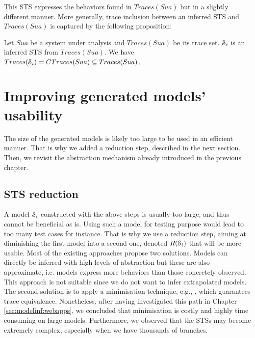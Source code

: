 This STS expresses the behaviors found in $Traces(Sua)$ but in a
slightly different manner. More generally, trace inclusion
between an inferred STS and $Traces(Sua)$ is captured by the
following proposition:

\begin{proposition}
  Let $Sua$ be a system under analysis and $Traces(Sua)$ be its
  trace set. $\EuScript{S}_i$ is an inferred STS from
  $Traces(Sua)$.
  We have $Traces(\EuScript{S}_i) = CTraces(Sua) \subseteq Traces(Sua)$.

	\label{def:equivtraces_IOSTS}
\end{proposition}


\section{Improving generated models' usability}
\label{sec:modelinf:usability}

The size of the generated models is likely too large to be used
in an efficient manner. That is why we added a reduction step,
described in the next section. Then, we revisit the abstraction
mechanism already introduced in the previous chapter.

\subsection{STS reduction}
\label{sec:modelinf:prodsystems:reduction}

A model $\EuScript{S}_i$ constructed with the above steps is
usually too large, and thus cannot be beneficial as is. Using
such a model for testing purpose would lead to too many test
cases for instance. That is why we use a reduction step, aiming
at diminishing the first model into a second one, denoted
$R(\EuScript{S}_i)$ that will be more usable. Most of the
existing approaches propose two solutions. Models can directly be
inferred with high levels of abstraction but these are also
approximate, i.e. models express more behaviors than those
concretely observed. This approach is not suitable since we do
not want to infer extrapolated models. The second solution is to
apply a minimisation technique, e.g., \cite{Abdulla06}, which
guarantees trace equivalence. Nonetheless, after having
investigated this path in Chapter \ref{sec:modelinf:webapps}, we
concluded that minimisation is costly and highly time consuming
on large models. Furthermore, we observed that the STSs may
become extremely complex, especially when we have thousands of
branches.

